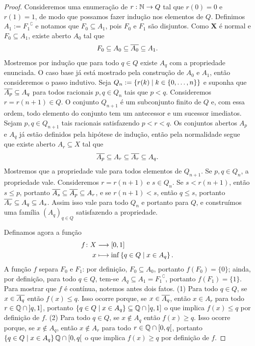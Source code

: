\begin{proof}
Consideremos uma enumeração de $r: \mathbb{N} \to Q$ tal que $r(0)=0$ e $r(1)=1$, de modo que possamos fazer indução nos elementos de $Q$. Definimos $A_1:={F_1}^\complement$ e notamos que $F_0 \subseteq A_1$, pois $F_0$ e $F_1$ são disjuntos. Como $\bm X$ é normal e $F_0 \subseteq A_1$, existe aberto $A_0$ tal que
	\begin{equation*}
	F_0 \subseteq A_0 \subseteq \overline{A_0} \subseteq A_1.
	\end{equation*}
Mostremos por indução que para todo $q \in Q$ existe $A_q$ com a propriedade enunciada. O caso base já está mostrado pela construção de $A_0$ e $A_1$, então consideremos o passo indutivo. Seja $Q_n := \left\{{r(k)}\;\middle\vert\;{k \in \{0,\ldots,n\}}\right\}$ e suponha que $\overline{A_p} \subseteq A_q$ para todos racionais $p,q \in Q_n$ tais que $p<q$. Consideremos $r=r(n+1) \in Q$. O conjunto $Q_{n+1}$ é um subconjunto finito de $Q$ e, com essa ordem, todo elemento do conjunto tem um antecessor e um sucessor imediatos. Sejam $p,q \in Q_{n+1}$ tais racionais satisfazendo $p<r<q$. Os conjuntos abertos $A_p$ e $A_q$ já estão definidos pela hipótese de indução, então pela normalidade segue que existe aberto $A_r \subseteq X$ tal que
	\begin{equation*}
	\overline{A_p} \subseteq A_r \subseteq \overline{A_r} \subseteq A_q.
	\end{equation*}
Mostremos que a propriedade vale para todos elementos de $Q_{n+1}$. Se $p,q \in Q_n$, a propriedade vale. Consideremos $r=r(n+1)$ e $s \in Q_n$. Se $s<r(n+1)$, então $s \leq p$, portanto $\overline{A_s} \subseteq \overline{A_p} \subseteq A_r$, e se $r(n+1) < s$, então $q \leq s$, portanto $\overline{A_r} \subseteq A_q \subseteq A_s$. Assim isso vale para todo $Q_n$ e portanto para $Q$, e construímos uma família $(A_q)_{q \in Q}$ satisfazendo a propriedade.

Definamos agora a função
	\begin{align*}
	{f}\colon {X} &\longrightarrow {[0,1]} \\{x} &\longmapsto \inf\left\{{q \in Q}\;\middle\vert\;{x \in A_q}\right\}.
	\end{align*}
A função $f$ separa $F_0$ e $F_1$: por definição, $F_0 \subseteq A_0$, portanto $f(F_0)=\{0\}$; ainda, por definição, para todo $q \in Q$, tem-se $A_q \subseteq A_1={F_1}^\complement$, portanto $f(F_1)=\{1\}$. Para mostrar que $f$ é contínua, notemos antes dois fatos. (1) Para todo $q \in Q$, se $x \in \overline{A_q}$ então $f(x) \leq q$. Isso ocorre porque, se $x \in \overline{A_q}$, então $x \in A_r$ para todo $r \in \mathbb{Q} \cap \left]q,1\right]$, portanto $\left\{{q \in Q}\;\middle\vert\;{x \in A_q}\right\} \subseteq \mathbb{Q} \cap \left]q,1\right]$ o que implica $f(x) \leq q$ por definição de $f$. (2) Para todo $q \in Q$, se $x \notin A_q$ então $f(x) \geq q$. Isso ocorre porque, se $x \notin A_q$, então $x \notin A_r$ para todo $r \in \mathbb{Q} \cap \left[0,q\right[$, portanto $\left\{{q \in Q}\;\middle\vert\;{x \in A_q}\right\}\mathbb{Q} \cap \left[0,q\right[$ o que implica $f(x) \geq q$ por definição de $f$.


\end{proof}
